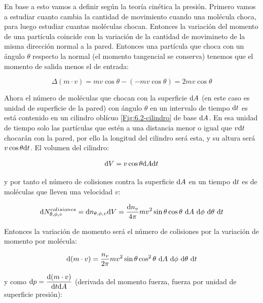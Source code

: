 \documentclass[12pt]{book}
\begin{document}
En base a esto vamos a definir según la teoría cinética la presión. Primero vamos a estudiar cuanto cambia la cantidad de movimiento cuando una molécula choca, para luego estudiar cuantas moléculas chocan. Entonces la variación del momento de una partícula coincide con la variación de la cantidad de movimineto de la misma dirección normal a la pared. Entonces una partícula que choca con un ángulo $\theta$ respecto la normal (el momento tangencial se conserva) tenemos que el momento de salida menos el de entrada: 

\newpage

\begin{equation}
\Delta (m \cdot v) = m v \cos \theta - (- m v \cos \theta) = 2 m v \cos \theta
\end{equation}



Ahora el número de moléculas que chocan con la superficie $\mathrm{d} A$ (en este caso es unidad de superficie de la pared) con ángulo $\theta$  en un intervalo de tiempo $\mathrm{d} t$ es está contenido en un cilindro oblícuo \ref{Fig:6.2-cilindro} de base $\mathrm{d} A$. En esa unidad de tiempo solo las partículas que estén a una distancia menor o igual que $v \mathrm{d} t$ chocarán con la pared, por ello la longitud del cilindro será esta, y su altura será $ v \cos \theta \mathrm{d} t$. El volumen del cilindro:

\begin{equation}
\mathrm{d} V = v \cos \theta \mathrm{d} A  \mathrm{d} t
\end{equation} 

y por tanto el número de colisiones contra la superficie $\mathrm{d} A$ en un tiempo $\mathrm{d} t$ es de moléculas que lleven una velocidad $v$:

\begin{equation}
\mathrm{d} N_ {\theta, \phi, v}^{colisiones} = \mathrm{d} n_{\theta, \phi,v} \mathrm{d} V = \dfrac{\mathrm{d} n_v}{4 \pi} m v^2 \sin \theta  \cos \theta \ \mathrm{d} A \ \mathrm{d} \phi \ \mathrm{d} \theta \ \mathrm{d} t
\end{equation}

Entonces la variación de momento será el número de colisiones por la variación de momento por molécula:

\begin{equation}
\mathrm{d} (m \cdot v) = \dfrac{n_v}{2 \pi} m v^2 \sin \theta \cos^2 \theta\ \mathrm{d} A \ \mathrm{d} \phi \ \mathrm{d} \theta \ \mathrm{d} t
\end{equation}

y como $\mathrm{d} p = \dfrac{\mathrm{d} (m \cdot v)}{\mathrm{d} t \mathrm{d} A}$ (derivada del momento fuerza, fuerza por unidad de superficie presión):
\end{document}
